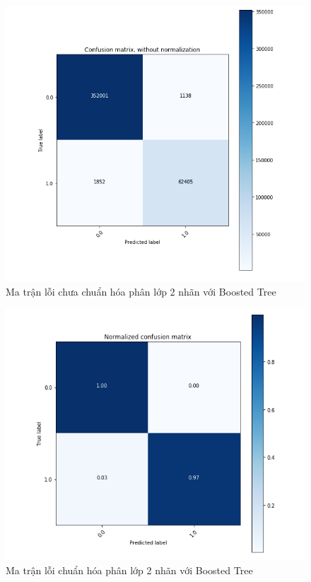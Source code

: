 \begin{figure}[H]
    \centering
    \includegraphics[scale=0.6]{confusion_2_no_norm}
    \caption{Ma trận lỗi chưa chuẩn hóa phân lớp 2 nhãn với Boosted Tree}
    \label{}
\end{figure}
\begin{figure}[H]
    \centering
    \includegraphics[scale=0.6]{confusion_2_norm}
    \caption{Ma trận lỗi chuẩn hóa phân lớp 2 nhãn với Boosted Tree}
    \label{}
\end{figure}
